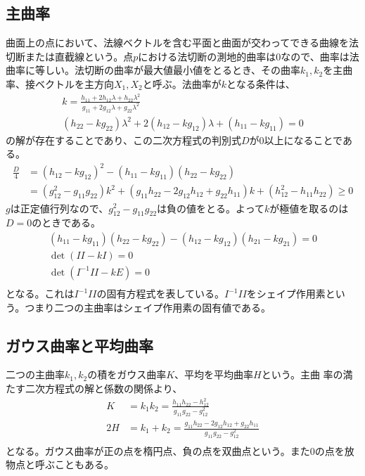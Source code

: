         \subsection{主曲率}
            曲面上の点において、法線ベクトルを含む平面と曲面が交わってできる曲線を法切断または直截線という。点$p$における法切断の測地的曲率は0なので、曲率は法曲率に等しい。法切断の曲率が最大値最小値をとるとき、その曲率$k_1,k_2$を主曲率、接ベクトルを主方向$X_1,X_2$と呼ぶ。法曲率が$k$となる条件は、
            \begin{gather*}
                k = \frac{h_{11} + 2h_{12}\lambda + h_{22}\lambda^2}{g_{11} + 2g_{12}\lambda + g_{22}\lambda^2}\\
                (h_{22}-kg_{22})\lambda^2 + 2(h_{12}-kg_{12})\lambda + (h_{11}-kg_{11}) = 0
            \end{gather*}
            の解が存在することであり、この二次方程式の判別式$D$が0以上になることである。
            \begin{align*}
                \frac{D}{4} &= (h_{12}-kg_{12})^2 - (h_{11}-kg_{11})(h_{22}-kg_{22})\\
                &= (g_{12}^2-g_{11}g_{22})k^2
                + (g_{11}h_{22}-2g_{12}h_{12}+g_{22}h_{11})k
                + (h_{12}^2-h_{11}h_{22}) \geq 0
            \end{align*}
            $g$は正定値行列なので、$g_{12}^2-g_{11}g_{22}$は負の値をとる。よって$k$が極値を取るのは$D = 0$のときである。
            \begin{align*}
                (h_{11}-kg_{11})(h_{22}-kg_{22})
                -(h_{12}-kg_{12})(h_{21}-kg_{21}) = 0\\
                \det(II - kI) = 0\\
                \det(I^{-1}II - kE) = 0\\
            \end{align*}
            となる。これは$I^{-1}II$の固有方程式を表している。$I^{-1}II$をシェイプ作用素という。つまり二つの主曲率はシェイプ作用素の固有値である。

        \subsection{ガウス曲率と平均曲率}
            二つの主曲率$k_1,k_2$の積をガウス曲率$K$、平均を平均曲率$H$という。主曲
            率の満たす二次方程式の解と係数の関係より、
            \begin{align*}
                K &= k_1k_2 = \frac{h_{11}h_{22} - h_{12}^2}{g_{11}g_{22} - g_{12}^2}\\
                2H &= k_1+k_2 = \frac{g_{11}h_{22} - 2g_{12}h_{12} + g_{22}h_{11}}
                {g_{11}g_{22}-g_{12}^2}\\
            \end{align*}
            となる。ガウス曲率が正の点を楕円点、負の点を双曲点という。また0の点を放物点と呼ぶこともある。


